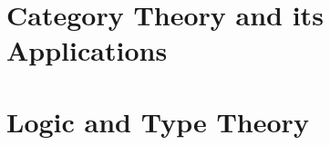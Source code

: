 \documentclass[12pt]{report}
\begin{document}









\part{Category Theory and its Applications}\label{part:category-theory-its}



\part{Logic and Type Theory}\label{part:logic-type-theory}




\printindex
\printbibliography%
\end{document}
